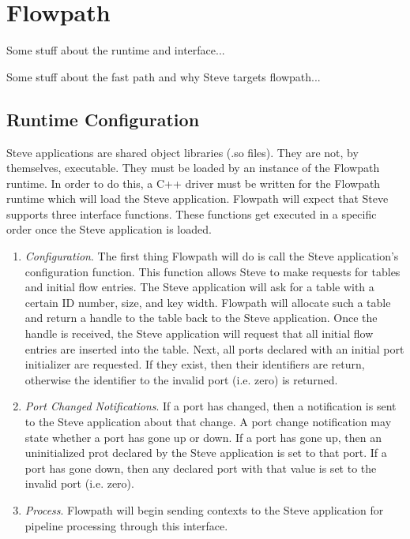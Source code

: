 \chapter{Flowpath} \label{ch:flowpath}

Some stuff about the runtime and interface...


Some stuff about the fast path and why Steve targets flowpath...

\section{Runtime Configuration} \label{config_guide}

Steve applications are shared object libraries (.so files). They are not, by themselves, executable. They must be loaded by an instance of the Flowpath runtime. In order to do this, a C++ driver must be written for the Flowpath runtime which will load the Steve application. Flowpath will expect that Steve supports three interface functions. These functions get executed in a specific order once the Steve application is loaded.

\begin{enumerate}
\item \textit{Configuration}. The first thing Flowpath will do is call the Steve application's configuration function. This function allows Steve to make requests for tables and initial flow entries. The Steve application will ask for a table with a certain ID number, size, and key width. Flowpath will allocate such a table and return a handle to the table back to the Steve application. Once the handle is received, the Steve application will request that all initial flow entries are inserted into the table. Next, all ports declared with an initial port initializer are requested. If they exist, then their identifiers are return, otherwise the identifier to the invalid port (i.e. zero) is returned.

\item \textit{Port Changed Notifications}. If a port has changed, then a notification is sent to the Steve application about that change. A port change notification may state whether a port has gone up or down. If a port has gone up, then an uninitialized prot declared by the Steve application is set to that port. If a port has gone down, then any declared port with that value is set to the invalid port (i.e. zero).

\item \textit{Process}. Flowpath will begin sending contexts to the Steve application for pipeline processing through this interface.
\end{enumerate}

